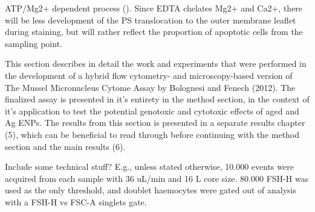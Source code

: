 ATP/Mg2+ dependent process (\cite{Connor1992}). Since EDTA chelates Mg2+ and Ca2+, there will be less development of the PS translocation to the outer membrane leaflet during staining, but will rather reflect the proportion of apoptotic cells from the sampling point.

This section describes in detail the work and experiments that were performed in the development of a hybrid flow cytometry- and microscopy-based version of The Mussel Micronucleus Cytome Assay by Bolognesi and Fenech (2012). The finalized assay is presented in it's entirety in the method section, in the context of it's application to test the potential genotoxic and cytotoxic effects of aged  and Ag \acrshort{ENPs}. The results from this section is presented in a separate results chapter (5), which can be beneficial to read through before continuing with the method section and the main results (6).

Include some technical stuff? E.g., unless stated otherwise, 10.000 events were acquired from each sample with 36 uL/min and 16 \micro L core size. 80.000 FSH-H was used as the only threshold, and doublet haemocytes were gated out of analysis with a FSH-H vs FSC-A singlets gate.